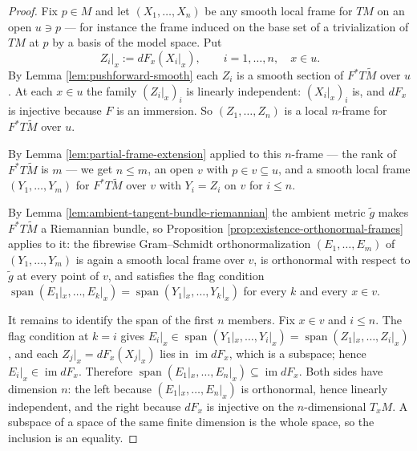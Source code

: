 \begin{proof}
\leanok
{}
Fix $p \in M$ and let $(X_1, \ldots, X_n)$ be any smooth local frame for $TM$ on an open
$u \ni p$ — for instance the frame induced on the base set of a trivialization of $TM$ at $p$ by
a basis of the model space. Put
\[
  Z_i|_x := dF_x(X_i|_x), \qquad i = 1, \ldots, n, \quad x \in u .
\]
By Lemma \ref{lem:pushforward-smooth} each $Z_i$ is a smooth section of $F^* T\tilde M$ over $u$.
At each $x \in u$ the family $(Z_i|_x)_i$ is linearly independent: $(X_i|_x)_i$ is, and $dF_x$ is
injective because $F$ is an immersion. So $(Z_1, \ldots, Z_n)$ is a local $n$-frame for
$F^* T\tilde M$ over $u$.

By Lemma \ref{lem:partial-frame-extension} applied to this $n$-frame — the rank of
$F^* T\tilde M$ is $m$ — we get $n \le m$, an open $v$ with $p \in v \subseteq u$, and a smooth
local frame $(Y_1, \ldots, Y_m)$ for $F^* T\tilde M$ over $v$ with $Y_i = Z_i$ on $v$ for
$i \le n$.

By Lemma \ref{lem:ambient-tangent-bundle-riemannian} the ambient metric $\tilde g$ makes
$F^* T\tilde M$ a Riemannian bundle, so Proposition \ref{prop:existence-orthonormal-frames}
applies to it: the fibrewise Gram--Schmidt orthonormalization $(E_1, \ldots, E_m)$ of
$(Y_1, \ldots, Y_m)$ is again a smooth local frame over $v$, is orthonormal with respect to
$\tilde g$ at every point of $v$, and satisfies the flag condition
$\operatorname{span}(E_1|_x, \ldots, E_k|_x) = \operatorname{span}(Y_1|_x, \ldots, Y_k|_x)$ for
every $k$ and every $x \in v$.

It remains to identify the span of the first $n$ members. Fix $x \in v$ and $i \le n$. The flag
condition at $k = i$ gives
$E_i|_x \in \operatorname{span}(Y_1|_x, \ldots, Y_i|_x) = \operatorname{span}(Z_1|_x, \ldots, Z_i|_x)$,
and each $Z_j|_x = dF_x(X_j|_x)$ lies in $\operatorname{im} dF_x$, which is a subspace; hence
$E_i|_x \in \operatorname{im} dF_x$. Therefore
$\operatorname{span}(E_1|_x, \ldots, E_n|_x) \subseteq \operatorname{im} dF_x$. Both sides have
dimension $n$: the left because $(E_1|_x, \ldots, E_n|_x)$ is orthonormal, hence linearly
independent, and the right because $dF_x$ is injective on the $n$-dimensional $T_x M$. A subspace
of a space of the same finite dimension is the whole space, so the inclusion is an equality.
\end{proof}

